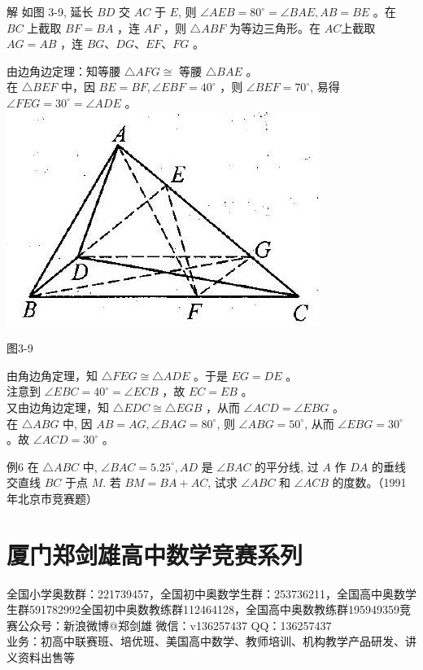 \documentclass[10pt]{article}
\begin{document}
解 如图 3-9, 延长 $B D$ 交 $A C$ 于 $E$, 则 $\angle A E B=80^{\circ}=\angle B A E, A B=B E$ 。在 $B C$ 上截取 $B F=B A$ ，连 $A F$ ，则 $\triangle A B F$ 为等边三角形。在 $A C$上截取 $A G=A B$ ，连 $B G 、 D G 、 E F 、 F G$ 。

由边角边定理：知等腰 $\triangle A F G \cong$ 等腰 $\triangle B A E$ 。\\
在 $\triangle B E F$ 中，因 $B E=B F, \angle E B F=40^{\circ}$ ，则 $\angle B E F=70^{\circ}$, 易得 $\angle F E G=30^{\circ}=\angle A D E$ 。\\
\includegraphics[max width=\textwidth, center]{2024_10_30_2c8f45efd4a519b08e1ag-028}

图3-9

由角边角定理，知 $\triangle F E G \cong \triangle A D E$ 。于是 $E G=D E$ 。\\
注意到 $\angle E B C=40^{\circ}=\angle E C B$ ，故 $E C=E B$ 。\\
又由边角边定理，知 $\triangle E D C \cong \triangle E G B$ ，从而 $\angle A C D=\angle E B G$ 。\\
在 $\triangle A B G$ 中, 因 $A B=A G, \angle B A G=80^{\circ}$, 则 $\angle A B G=50^{\circ}$, 从而 $\angle E B G=30^{\circ}$ 。故 $\angle A C D=30^{\circ}$ 。

例6 在 $\triangle A B C$ 中, $\angle B A C=5.25^{\circ}, A D$ 是 $\angle B A C$ 的平分线, 过 $A$ 作 $D A$ 的垂线交直线 $B C$ 于点 $M$. 若 $B M=B A+A C$, 试求 $\angle A B C$ 和 $\angle A C B$ 的度数。（1991年北京市竞赛题）

\section*{厦门郑剑雄高中数学竞赛系列}
全国小学奥数群：221739457，全国初中奥数学生群：253736211，全国高中奥数学生群591782992全国初中奥数教练群112464128，全国高中奥数教练群195949359竞赛公众号：新浪微博@郑剑雄 微信：v136257437 QQ：136257437\\
业务：初高中联赛班、培优班、美国高中数学、教师培训、机构教学产品研发、讲义资料出售等
\end{document}
